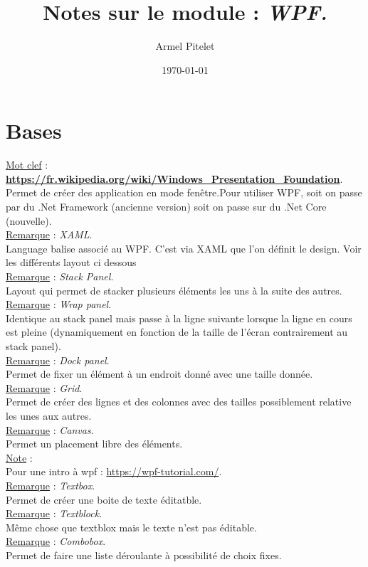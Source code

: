 \documentclass[a4paper,12pt,twoside]{article}
\title{Notes sur le module : \textit{WPF.}}
\author{Armel Pitelet}
\date{\today}
\newcommand{\urlcolor}{magenta}  %
\newcommand{\keycolor}{purple} %
\newcommand{\rem}[2]{\noindent\underline{Remarque} : \textit{#1}.\\ \indent #2}
\newcommand{\note}[1]{\noindent\underline{Note} : \\ \indent #1}
\newcommand{\keyref}[2]{\hypersetup{urlcolor=\keycolor} \href{#1}{\textbf{#2}}\hypersetup{urlcolor=\urlcolor}}
\newcommand{\keyword}[3]{\noindent\underline{Mot clef} : \keyref{#1}{#2}. \\ \indent #3}
\begin{document}
\maketitle
\tableofcontents

\section{Bases}

\keyword{WPF}{https://fr.wikipedia.org/wiki/Windows_Presentation_Foundation}{Permet de créer des application en mode fenêtre.Pour utiliser WPF, soit on passe par du .Net Framework (ancienne version) soit on passe sur du .Net Core (nouvelle).}\\

\rem{XAML}{Language balise associé au WPF. C'est via XAML que l'on définit le design. Voir les différents layout ci dessous}\\

\rem{Stack Panel}{Layout qui permet de stacker plusieurs éléments les uns à la suite des autres.}\\

\rem{Wrap panel}{Identique au stack panel mais passe à la ligne suivante lorsque la ligne en cours est pleine (dynamiquement en fonction de la taille de l'écran contrairement au stack panel).}\\

\rem{Dock panel}{Permet de fixer un élément à un endroit donné avec une taille donnée.}\\

\rem{Grid}{Permet de créer des lignes et des colonnes avec des tailles possiblement relative les unes aux autres.}\\

\rem{Canvas}{Permet un placement libre des éléments.}\\

\note{Pour une intro à wpf : \url{https://wpf-tutorial.com/}.}\\

\rem{Textbox}{Permet de créer une boite de texte éditatble.}\\

\rem{Textblock}{Même chose que textblox mais le texte n'est pas éditable.}\\

\rem{Combobox}{Permet de faire une liste déroulante à possibilité de choix fixes.}\\
\end{document}

